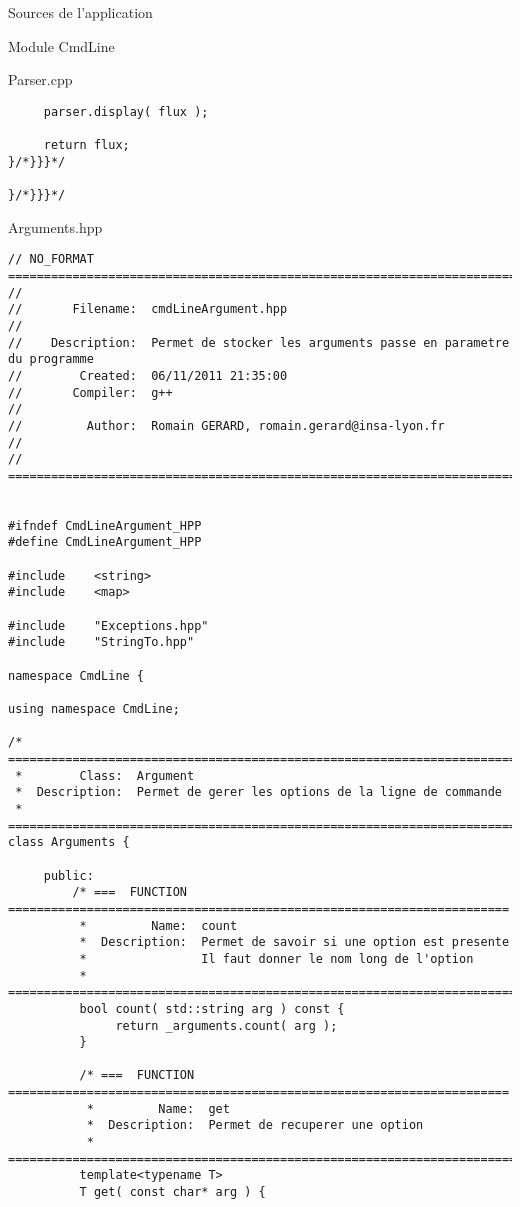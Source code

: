 \documentclass{article}
\begin{document}
\begin{section}{Sources de l'application}
\begin{subsection}{Module CmdLine}
\begin{paragraph}{Parser.cpp}
\begin{verbatim}
     parser.display( flux );

     return flux;
}/*}}}*/

}/*}}}*/
      \end{verbatim}
      \end{paragraph}

\newpage
  \begin{paragraph}{Arguments.hpp}
   \begin{verbatim}
// NO_FORMAT ============================================================================
//
//       Filename:  cmdLineArgument.hpp
//
//    Description:  Permet de stocker les arguments passe en parametre du programme
//        Created:  06/11/2011 21:35:00
//       Compiler:  g++
//
//         Author:  Romain GERARD, romain.gerard@insa-lyon.fr
//
// =====================================================================================


#ifndef CmdLineArgument_HPP
#define CmdLineArgument_HPP

#include    <string>
#include    <map>

#include	"Exceptions.hpp"
#include    "StringTo.hpp"

namespace CmdLine {

using namespace CmdLine;

/* =====================================================================================
 *        Class:  Argument
 *  Description:  Permet de gerer les options de la ligne de commande
 * =====================================================================================*/
class Arguments {

     public:
         /* ===  FUNCTION  ======================================================================
          *         Name:  count
          *  Description:  Permet de savoir si une option est presente
          *                Il faut donner le nom long de l'option
          * =====================================================================================*/
          bool count( std::string arg ) const {
               return _arguments.count( arg );
          }

          /* ===  FUNCTION  ======================================================================
           *         Name:  get
           *  Description:  Permet de recuperer une option 
           * =====================================================================================*/
          template<typename T>
          T get( const char* arg ) {


\end{verbatim}
\end{paragraph}
\end{subsection}
\end{section}
\end{document}
